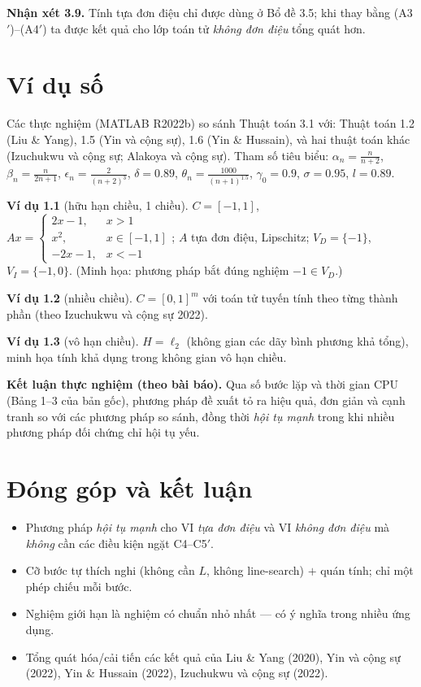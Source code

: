 \documentclass{MyBook}
\theoremstyle{plain}
\theoremstyle{definition}
\newtheorem{example}{Ví dụ}
\begin{document}
\medskip
\noindent\textbf{Nhận xét 3.9.} Tính tựa đơn điệu chỉ được dùng ở Bổ đề 3.5; khi thay bằng (A3$'$)--(A4$'$) ta được kết quả cho lớp toán tử \emph{không đơn điệu} tổng quát hơn.

\chapter{Ví dụ số}

Các thực nghiệm (MATLAB R2022b) so sánh Thuật toán 3.1 với: Thuật toán 1.2 (Liu \& Yang), 1.5 (Yin và cộng sự), 1.6 (Yin \& Hussain), và hai thuật toán khác (Izuchukwu và cộng sự; Alakoya và cộng sự). Tham số tiêu biểu: $\alpha_n=\tfrac{n}{n+2}$, $\beta_n=\tfrac{n}{2n+1}$, $\epsilon_n=\tfrac{2}{(n+2)^3}$, $\delta=0.89$, $\theta_n=\tfrac{1000}{(n+1)^{1.5}}$, $\gamma_0=0.9$, $\sigma=0.95$, $l=0.89$.

\begin{example}[hữu hạn chiều, 1 chiều]
$C=[-1,1]$, $Ax=\begin{cases}2x-1,&x>1\\ x^2,&x\in[-1,1]\\ -2x-1,&x<-1\end{cases}$; $A$ tựa đơn điệu, Lipschitz; $V_D=\{-1\}$, $V_I=\{-1,0\}$. (Minh họa: phương pháp bắt đúng nghiệm $-1\in V_D$.)
\end{example}
\begin{example}[nhiều chiều]
$C=[0,1]^m$ với toán tử tuyến tính theo từng thành phần (theo Izuchukwu và cộng sự 2022).
\end{example}
\begin{example}[vô hạn chiều]
$H=\ell_2$ (không gian các dãy bình phương khả tổng), minh họa tính khả dụng trong không gian vô hạn chiều.
\end{example}

\noindent\textbf{Kết luận thực nghiệm (theo bài báo).} Qua số bước lặp và thời gian CPU (Bảng 1--3 của bản gốc), phương pháp đề xuất tỏ ra hiệu quả, đơn giản và cạnh tranh so với các phương pháp so sánh, đồng thời \emph{hội tụ mạnh} trong khi nhiều phương pháp đối chứng chỉ hội tụ yếu.

\chapter{Đóng góp và kết luận}

\begin{itemize}[leftmargin=1.4em,itemsep=1pt]
\item Phương pháp \emph{hội tụ mạnh} cho VI \emph{tựa đơn điệu} và VI \emph{không đơn điệu} mà \emph{không} cần các điều kiện ngặt C4--C5$'$.
\item Cỡ bước tự thích nghi (không cần $L$, không line-search) $+$ quán tính; chỉ một phép chiếu mỗi bước.
\item Nghiệm giới hạn là nghiệm có chuẩn nhỏ nhất --- có ý nghĩa trong nhiều ứng dụng.
\item Tổng quát hóa/cải tiến các kết quả của Liu \& Yang (2020), Yin và cộng sự (2022), Yin \& Hussain (2022), Izuchukwu và cộng sự (2022).
\end{itemize}
\end{document}
